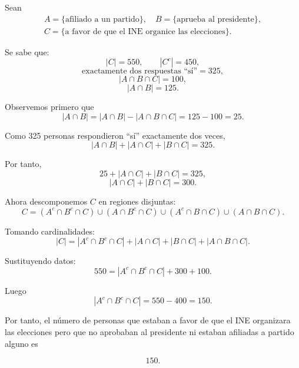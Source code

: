 \documentclass[12pt,a4paper]{article}
\begin{document}
    \begin{solucion}
        Sean
        \begin{align*}
             A=\{\text{afiliado a un partido}\},\quad
            B=\{\text{aprueba al presidente}\},\\
            C=\{\text{a favor de que el INE organice las elecciones}\}.
        \end{align*}
    
        Se sabe que:
        \[
            |C|=550,\qquad |C^c|=450,
        \]
        \[
            \text{exactamente dos respuestas ``sí''}=325,
        \]
        \[
            |A\cap B\cap C|=100,
        \]
        \[
            |A\cap B|=125.
        \]
    
        Observemos primero que
        \[
            |A\cap B|=
            |A\cap B|-|A\cap B\cap C|
            =125-100=25.
        \]
    
        Como 325 personas respondieron ``sí'' exactamente dos veces,
        \[
            |A\cap B|
            +|A\cap C|
            +|B\cap C|
            =325.
        \]
    
        Por tanto,
        \[
            25+|A\cap C|
            +|B\cap C|
            =325,
        \]
        \[
            |A\cap C|
            +|B\cap C|
            =300.
        \]
    
        Ahora descomponemos $C$ en regiones disjuntas:
        \[
            C=
            (A^c\cap B^c\cap C)
            \cup
            (A\cap B^c\cap C)
            \cup
            (A^c\cap B\cap C)
            \cup
            (A\cap B\cap C).
        \]
    
        Tomando cardinalidades:
        \[
            |C|=
            |A^c\cap B^c\cap C|
            +|A\cap C|
            +|B\cap C|
            +|A\cap B\cap C|.
        \]
    
        Sustituyendo datos:
        \[
            550=
            |A^c\cap B^c\cap C|
            +300
            +100.
        \]
    
        Luego
        \[
            |A^c\cap B^c\cap C|
            =550-400
            =150.
        \]
    
        Por tanto, el número de personas que estaban a favor
        de que el INE organizara las elecciones pero que
        no aprobaban al presidente ni estaban afiliadas a partido alguno es
    
        \[
           150.
        \]
    \end{solucion}
\end{document}
